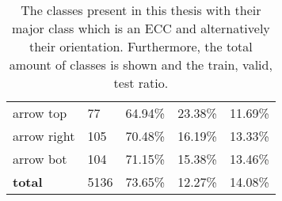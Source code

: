 \begin{table}
\begin{center}
\begin{tabular}{l|l|l|l|l|}
    arrow top               & 77     &  64.94\%  &   23.38\%  & 11.69\% \\
    arrow right             & 105    &  70.48\%  &   16.19\%  & 13.33\% \\
    arrow bot               & 104    &  71.15\%  &   15.38\%  & 13.46\% \\
    \hline
    \textbf{total}          & 5136   &  73.65\%  &   12.27\%  & 14.08\% \\
\end{tabular}
\caption{The classes present in this thesis with their major class which is an \ac{ECC} and alternatively their orientation. Furthermore, the total amount of classes is shown and the train, valid, test ratio.}
\label{tab:yolo_classes}
\end{center}
\end{table}
